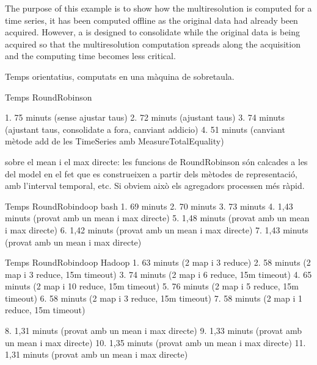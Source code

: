   The purpose
of this example is to show how the multiresolution is computed for a
time series, it has been computed offline as the original data had
already been acquired. However, a  is designed to
consolidate while the original data is being acquired so that the
multiresolution computation spreads along the acquisition and the
computing time becomes less critical.



Temps orientatius, computats en una màquina de sobretaula. 

Temps RoundRobinson

1. 75 minuts (sense ajustar taus)
2. 72 minuts (ajustant taus)
3. 74 minuts (ajustant taus, consolidate a fora, canviant addicio)
4. 51 minuts (canviant mètode add de les TimeSeries amb MeasureTotalEquality)



sobre el mean i el max directe: les funcions de RoundRobinson són calcades a les del model en el fet que es construeixen a partir dels mètodes de representació, amb l'interval temporal, etc.  Si obviem això els agregadors processen més ràpid.


Temps RoundRobindoop bash
1. 69 minuts
2. 70 minuts
3. 73 minuts
4. 1,43 minuts  (provat amb un mean i max directe)
5. 1,48 minuts  (provat amb un mean i max directe)
6. 1,42 minuts  (provat amb un mean i max directe)
7. 1,43 minuts  (provat amb un mean i max directe)


Temps RoundRobindoop Hadoop
1. 63 minuts  (2 map i 3 reduce)
2. 58 minuts  (2 map i 3 reduce, 15m timeout)
3. 74 minuts (2 map i 6 reduce, 15m timeout)
4. 65 minuts (2 map i 10 reduce, 15m timeout)
5. 76 minuts (2 map i 5 reduce, 15m timeout)
6. 58 minuts  (2 map i 3 reduce, 15m timeout)
7. 58 minuts (2 map i 1 reduce, 15m timeout)

8. 1,31 minuts (provat amb un mean i max directe)
9. 1,33 minuts (provat amb un mean i max directe)
10. 1,35 minuts (provat amb un mean i max directe)
11. 1,31 minuts (provat amb un mean i max directe)






